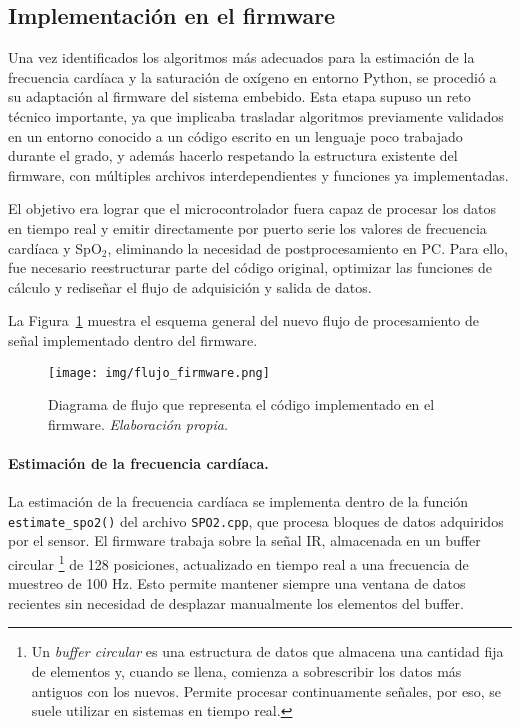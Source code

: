 \subsection{Implementación en el firmware}

Una vez identificados los algoritmos más adecuados para la estimación de la frecuencia cardíaca y la saturación de oxígeno en entorno Python, se procedió a su adaptación al firmware del sistema embebido. Esta etapa supuso un reto técnico importante, ya que implicaba trasladar algoritmos previamente validados en un entorno conocido a un código escrito en un lenguaje poco trabajado durante el grado, y además hacerlo respetando la estructura existente del firmware, con múltiples archivos interdependientes y funciones ya implementadas.

El objetivo era lograr que el microcontrolador fuera capaz de procesar los datos en tiempo real y emitir directamente por puerto serie los valores de frecuencia cardíaca y SpO$_2$, eliminando la necesidad de postprocesamiento en PC. Para ello, fue necesario reestructurar parte del código original, optimizar las funciones de cálculo y rediseñar el flujo de adquisición y salida de datos.

La Figura~\ref{fig:flujo_firmware} muestra el esquema general del nuevo flujo de procesamiento de señal implementado dentro del firmware.


\begin{figure}[H]
    \centering
    \texttt{[image: img/flujo\_firmware.png]}
    \caption{Diagrama de flujo que representa el código implementado en el firmware. \textit{Elaboración propia.}}
    \label{fig:flujo_firmware}
\end{figure}

\newpage

\paragraph{Estimación de la frecuencia cardíaca.}

La estimación de la frecuencia cardíaca se implementa dentro de la función \texttt{estimate\_spo2()} del archivo \texttt{SPO2.cpp}, que procesa bloques de datos adquiridos por el sensor. El firmware trabaja sobre la señal IR, almacenada en un buffer circular \footnote{Un \textit{buffer circular} es una estructura de datos que almacena una cantidad fija de elementos y, cuando se llena, comienza a sobrescribir los datos más antiguos con los nuevos. Permite procesar continuamente señales, por eso, se suele utilizar en sistemas en tiempo real.}
de 128 posiciones, actualizado en tiempo real a una frecuencia de muestreo de 100 Hz. Esto permite mantener siempre una ventana de datos recientes sin necesidad de desplazar manualmente los elementos del buffer.

